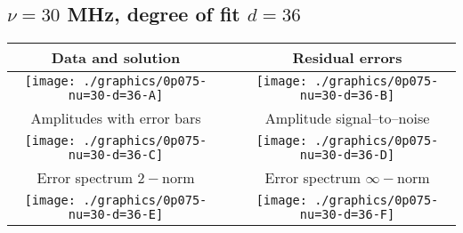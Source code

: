 

% 

\clearpage{}
\break{}

\subsection{$\nu = 30$ MHz, degree of fit $d = 36$}

\begin{table}[h]
    \begin{center}
        \begin{tabular}{ccc}
            Data and solution & \quad & Residual errors \\\hline
            \texttt{[image: ./graphics/0p075-nu=30-d=36-A]} &&
            \texttt{[image: ./graphics/0p075-nu=30-d=36-B]} \\[15pt]
            Amplitudes with error bars && Amplitude signal--to--noise \\\hline
            \texttt{[image: ./graphics/0p075-nu=30-d=36-C]} &&
            \texttt{[image: ./graphics/0p075-nu=30-d=36-D]} \\[15pt]
            Error spectrum $2-$norm && Error spectrum $\infty-$norm \\\hline
            \texttt{[image: ./graphics/0p075-nu=30-d=36-E]} &&
            \texttt{[image: ./graphics/0p075-nu=30-d=36-F]} \\[15pt]
        \end{tabular}
    \end{center}
\label{fig:elev=75, nu=30}
\end{table}



\endinput
